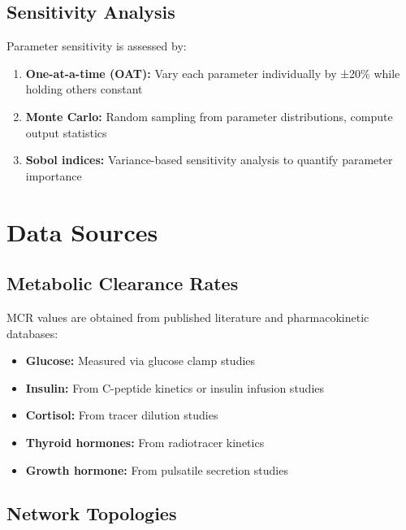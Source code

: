 \documentclass[
]{book}
\providecommand{\tightlist}{%
  \setlength{\itemsep}{0pt}\setlength{\parskip}{0pt}}
\begin{document}
\subsection{Sensitivity Analysis}\label{sensitivity-analysis}

Parameter sensitivity is assessed by:

\begin{enumerate}
\def\labelenumi{\arabic{enumi}.}
\tightlist
\item
  \textbf{One-at-a-time (OAT):} Vary each parameter individually by ±20\% while holding others constant
\item
  \textbf{Monte Carlo:} Random sampling from parameter distributions, compute output statistics
\item
  \textbf{Sobol indices:} Variance-based sensitivity analysis to quantify parameter importance
\end{enumerate}

\section{Data Sources}\label{data-sources}

\subsection{Metabolic Clearance Rates}\label{metabolic-clearance-rates}

MCR values are obtained from published literature and pharmacokinetic databases:

\begin{itemize}
\tightlist
\item
  \textbf{Glucose:} Measured via glucose clamp studies \citep{DeFronzo1979}
\item
  \textbf{Insulin:} From C-peptide kinetics or insulin infusion studies \citep{Polonsky1986}
\item
  \textbf{Cortisol:} From tracer dilution studies \citep{Rosenfield1971}
\item
  \textbf{Thyroid hormones:} From radiotracer kinetics \citep{Cavalieri1984}
\item
  \textbf{Growth hormone:} From pulsatile secretion studies \citep{Veldhuis1996}
\end{itemize}

\subsection{Network Topologies}\label{network-topologies}
\end{document}
